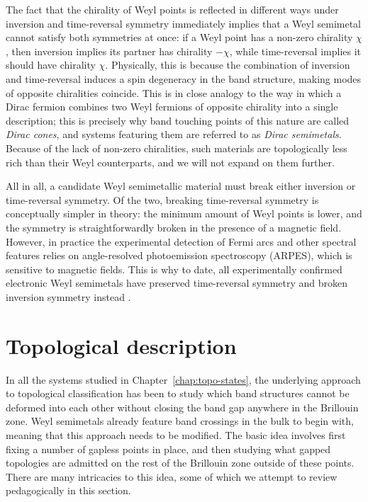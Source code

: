 The fact that the chirality of Weyl points is reflected in different ways under inversion and time-reversal symmetry immediately implies that a Weyl semimetal cannot satisfy both symmetries at once: if a Weyl point has a non-zero chirality $\chi$, then inversion implies its partner has chirality $-\chi$, while time-reversal implies it should have chirality $\chi$. Physically, this is because the combination of inversion and time-reversal induces a spin degeneracy in the band structure, making modes of opposite chiralities coincide. This is in close analogy to the way in which a Dirac fermion combines two Weyl fermions of opposite chirality into a single description; this is precisely why band touching points of this nature are called \emph{Dirac cones}, and systems featuring them are referred to as \emph{Dirac semimetals}. Because of the lack of non-zero chiralities, such materials are topologically less rich than their Weyl counterparts, and we will not expand on them further. %

All in all, a candidate Weyl semimetallic material must break either inversion or time-reversal symmetry. Of the two, breaking time-reversal symmetry is conceptually simpler in theory: the minimum amount of Weyl points is lower, and the symmetry is straightforwardly broken in the presence of a magnetic field. However, in practice the experimental detection of Fermi arcs and other spectral features relies on angle-resolved photoemission spectroscopy (ARPES), which is sensitive to magnetic fields. This is why to date, all experimentally confirmed electronic Weyl semimetals have preserved time-reversal symmetry and broken inversion symmetry instead  \cite{Weng_WSM-candidates,Huang_WSM-candidates,Lv_WSM-TaAs,Xu_WSM-experiment,Belopolski_minimal-WSM}.


\section{Topological description}\label{sec:semimetal-topology}

In all the systems studied in Chapter~\ref{chap:topo-states}, the underlying approach to topological classification has been to study which band structures cannot be deformed into each other without closing the band gap anywhere in the Brillouin zone. Weyl semimetals already feature band crossings in the bulk to begin with, meaning that this approach needs to be modified. The basic idea involves first fixing a number of gapless points in place, and then studying what gapped topologies are admitted on the rest of the Brillouin zone outside of these points. There are many intricacies to this idea, some of which we attempt to review pedagogically in this section.

